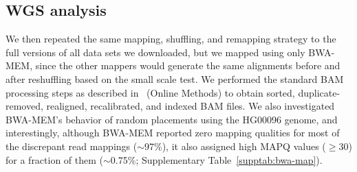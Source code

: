 \documentclass[10pt,a4paper]{article}
\begin{document}
\subsection*{WGS analysis}
We then repeated the same mapping, shuffling, and remapping strategy to the full versions of all data sets we downloaded, but we mapped using only BWA-MEM, since the other mappers 
would generate the same alignments before and after reshuffling based on the small scale test. We performed the standard BAM processing steps as described 
in~\cite{VanderAuwera2013} (Online Methods) to obtain sorted, duplicate-removed, realigned, recalibrated, and indexed BAM files. We also investigated BWA-MEM's behavior of random placements using the
HG00096 genome, and interestingly, although BWA-MEM reported zero mapping qualities for 
most of the discrepant read mappings ($\sim$97\%), it also assigned high MAPQ values ($\geq$30) for a fraction of them  ($\sim$0.75\%; Supplementary Table~\ref{supptab:bwa-map}). 


\end{document}
